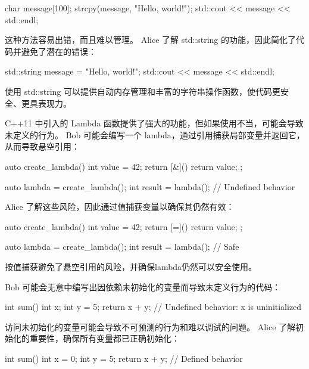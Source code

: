 \begin{cpp}
char message[100];
strcpy(message, "Hello, world!");
std::cout << message << std::endl;
\end{cpp}

这种方法容易出错，而且难以管理。 Alice 了解 std::string 的功能，因此简化了代码并避免了潜在的错误：

\begin{cpp}
std::string message = "Hello, world!";
std::cout << message << std::endl;
\end{cpp}

使用 std::string 可以提供自动内存管理和丰富的字符串操作函数，使代码更安全、更具表现力。


C++11 中引入的 Lambda 函数提供了强大的功能，但如果使用不当，可能会导致未定义的行为。 Bob 可能会编写一个 lambda，通过引用捕获局部变量并返回它，从而导致悬空引用：

\begin{cpp}
auto create_lambda() {
    int value = 42;
    return [&]() { return value; };
}

auto lambda = create_lambda();
int result = lambda(); // Undefined behavior
\end{cpp}

Alice 了解这些风险，因此通过值捕获变量以确保其仍然有效：

\begin{cpp}
auto create_lambda() {
    int value = 42;
    return [=]() { return value; };
}

auto lambda = create_lambda();
int result = lambda(); // Safe
\end{cpp}

按值捕获避免了悬空引用的风险，并确保lambda仍然可以安全使用。


Bob 可能会无意中编写出因依赖未初始化的变量而导致未定义行为的代码：

\begin{cpp}
int sum() {
    int x;
    int y = 5;
    return x + y; // Undefined behavior: x is uninitialized
}
\end{cpp}

访问未初始化的变量可能会导致不可预测的行为和难以调试的问题。 Alice 了解初始化的重要性，确保所有变量都已正确初始化：

\begin{cpp}
int sum() {
    int x = 0;
    int y = 5;
    return x + y; // Defined behavior
}
\end{cpp}

